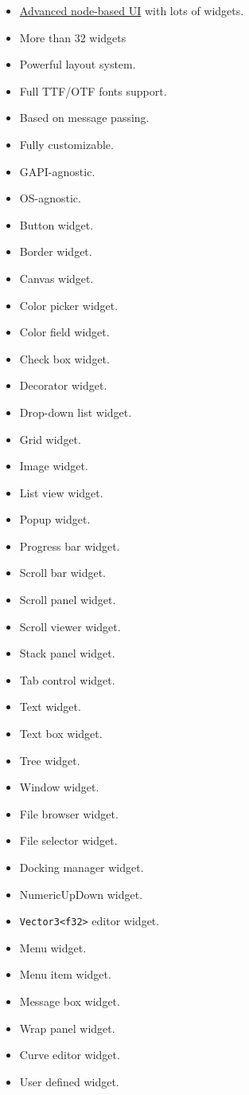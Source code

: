 \documentclass[
]{book}
\providecommand{\tightlist}{%
  \setlength{\itemsep}{0pt}\setlength{\parskip}{0pt}}
\theoremstyle{definition}
\theoremstyle{definition}
\theoremstyle{definition}
\theoremstyle{definition}
\theoremstyle{remark}
\begin{document}
\begin{itemize}
\tightlist
\item
  \href{https://github.com/FyroxEngine/Fyrox/tree/master/fyrox-ui}{Advanced node-based UI} with lots of widgets.
\item
  More than 32 widgets
\item
  Powerful layout system.
\item
  Full TTF/OTF fonts support.
\item
  Based on message passing.
\item
  Fully customizable.
\item
  GAPI-agnostic.
\item
  OS-agnostic.
\item
  Button widget.
\item
  Border widget.
\item
  Canvas widget.
\item
  Color picker widget.
\item
  Color field widget.
\item
  Check box widget.
\item
  Decorator widget.
\item
  Drop-down list widget.
\item
  Grid widget.
\item
  Image widget.
\item
  List view widget.
\item
  Popup widget.
\item
  Progress bar widget.
\item
  Scroll bar widget.
\item
  Scroll panel widget.
\item
  Scroll viewer widget.
\item
  Stack panel widget.
\item
  Tab control widget.
\item
  Text widget.
\item
  Text box widget.
\item
  Tree widget.
\item
  Window widget.
\item
  File browser widget.
\item
  File selector widget.
\item
  Docking manager widget.
\item
  NumericUpDown widget.
\item
  \texttt{Vector3\textless{}f32\textgreater{}} editor widget.
\item
  Menu widget.
\item
  Menu item widget.
\item
  Message box widget.
\item
  Wrap panel widget.
\item
  Curve editor widget.
\item
  User defined widget.
\end{itemize}
\end{document}
